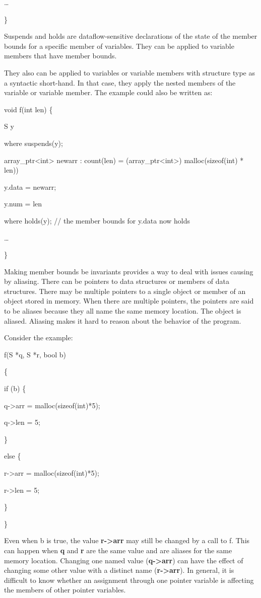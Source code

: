 \documentclass[]{article}
\begin{document}
\ldots{}

\}

Suspends and holds are dataflow-sensitive declarations of the state of
the member bounds for a specific member of variables. They can be
applied to variable members that have member bounds.

They also can be applied to variables or variable members with structure
type as a syntactic short-hand. In that case, they apply the nested
members of the variable or variable member. The example could also be
written as:

void f(int len) \{

S y

where suspends(y);

array\_ptr\textless{}int\textgreater{} newarr : count(len) =
(array\_ptr\textless{}int\textgreater{}) malloc(sizeof(int) * len))

y.data = newarr;

y.num = len

where holds(y); // the member bounds for y.data now holds

\ldots{}

\}

Making member bounds be invariants provides a way to deal with issues
causing by aliasing. There can be pointers to data structures or members
of data structures. There may be multiple pointers to a single object or
member of an object stored in memory. When there are multiple pointers,
the pointers are said to be aliases because they all name the same
memory location. The object is aliased. Aliasing makes it hard to reason
about the behavior of the program.

Consider the example:

f(S *q, S *r, bool b)

\{

if (b) \{

q-\textgreater{}arr = malloc(sizeof(int)*5);

q-\textgreater{}len = 5;

\}

else \{

r-\textgreater{}arr = malloc(sizeof(int)*5);

r-\textgreater{}len = 5;

\}

\}

Even when b is true, the value \textbf{r-\textgreater{}arr} may still be
changed by a call to f. This can happen when \textbf{q} and \textbf{r}
are the same value and are aliases for the same memory location.
Changing one named value (\textbf{q-\textgreater{}arr}) can have the
effect of changing some other value with a distinct name
(\textbf{r-\textgreater{}arr}). In general, it is difficult to know
whether an assignment through one pointer variable is affecting the
members of other pointer variables.
\end{document}
